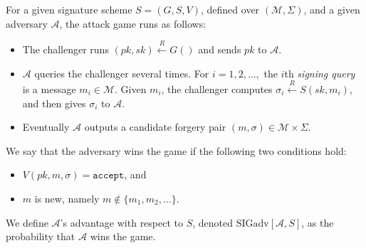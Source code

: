 For a given signature scheme $S = (G, S, V)$, defined over $(\mathcal{M}, \Sigma)$, and a given adversary $\mathcal{A}$, the attack game runs as follows:
\begin{itemize}
    \item The challenger runs $(pk, sk) \overset{R}{\longleftarrow} G()$ and sends $pk$ to $\mathcal{A}$.
    \item $\mathcal{A}$ queries the challenger several times.
        For $i = 1, 2, \dots,$ the $i$th \textit{signing query} is a message $m_i \in \mathcal{M}$.
        Given $m_i$, the challenger computes $\sigma_i \overset{R}{\longleftarrow} S(sk, m_i)$, and then gives $\sigma_i$ to $\mathcal{A}$.
    \item Eventually $\mathcal{A}$ outputs a candidate forgery pair $(m, \sigma) \in \mathcal{M} \times \Sigma$.
\end{itemize}
We say that the adversary wins the game if the following two conditions hold:
\begin{itemize}
    \item $V(pk, m, \sigma) = \texttt{accept}$, and
    \item $m$ is new, namely $m \not\in \{ m_1, m_2, \dots \}$.
\end{itemize}

We define $\mathcal{A}$'s advantage with respect to $S$, denoted $\text{SIGadv}[\mathcal{A}, S]$, as the probability that $\mathcal{A}$ wins the game.
